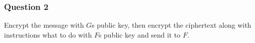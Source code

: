 \documentclass{article}
\numberwithin{defn}{section}
\numberwithin{equation}{section}
\begin{document}
	\subsubsection*{Question 2}
	Encrypt the message with $G$s public key, then encrypt the ciphertext along with instructions what to do with $F$s public key and send it to $F$.
	


\end{document}
